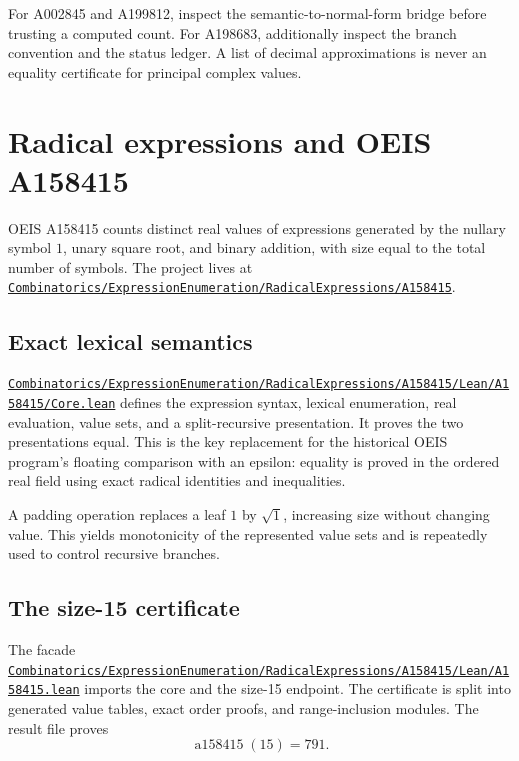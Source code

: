 \documentclass[
  10pt,
  a4paper,
  twoside,
  open=any,
  parskip=half,
  headings=big
]{scrreprt}
\newcommand{\CommitFull}{56a402bf82a9aab119fcbe3e96b991d387b221c5}
\newcommand{\RepoWeb}{https://github.com/VladimirReshetnikov/ProveIt}
\newcommand{\RepoBlobBase}{\RepoWeb/blob/\CommitFull}
\newcommand{\RepoTreeBase}{\RepoWeb/tree/\CommitFull}
\newcommand{\RepoFile}[1]{\href{\RepoBlobBase/#1}{\nolinkurl{#1}}}
\newcommand{\RepoDir}[1]{\href{\RepoTreeBase/#1}{\nolinkurl{#1}}}
\begin{document}
\begin{statusbox}
For A002845 and A199812, inspect the semantic-to-normal-form bridge before trusting a computed count. For A198683, additionally inspect the branch convention and the status ledger. A list of decimal approximations is never an equality certificate for principal complex values.
\end{statusbox}

\section{Radical expressions and OEIS A158415}
\label{sec:a158415}

OEIS A158415 counts distinct real values of expressions generated by the nullary symbol $1$, unary square root, and binary addition, with size equal to the total number of symbols. The project lives at
\RepoDir{Combinatorics/ExpressionEnumeration/RadicalExpressions/A158415}.

\subsection{Exact lexical semantics}

\RepoFile{Combinatorics/ExpressionEnumeration/RadicalExpressions/A158415/Lean/A158415/Core.lean}
defines the expression syntax, lexical enumeration, real evaluation, value sets, and a split-recursive presentation. It proves the two presentations equal. This is the key replacement for the historical OEIS program's floating comparison with an epsilon: equality is proved in the ordered real field using exact radical identities and inequalities.

A padding operation replaces a leaf $1$ by $\sqrt1$, increasing size without changing value. This yields monotonicity of the represented value sets and is repeatedly used to control recursive branches.

\subsection{The size-15 certificate}

The facade
\RepoFile{Combinatorics/ExpressionEnumeration/RadicalExpressions/A158415/Lean/A158415.lean}
imports the core and the size-15 endpoint. The certificate is split into generated value tables, exact order proofs, and range-inclusion modules. The result file proves
\[
  \operatorname{a158415}(15)=791.
\]
\end{document}
